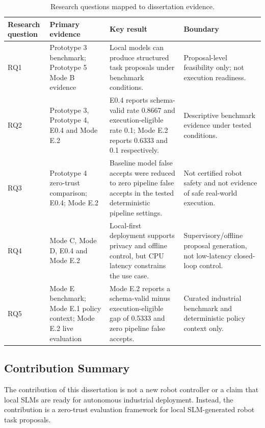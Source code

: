 \documentclass[sigconf,nonacm]{acmart}
\begin{document}
\begin{table}[t]
\centering
\caption{Research questions mapped to dissertation evidence.}
\label{tab:rq_to_evidence}
\footnotesize
\begin{tabularx}{\textwidth}{L{0.12\textwidth}Y Y Y}
\toprule
Research question & Primary evidence & Key result & Boundary \\
\midrule
RQ1 & Prototype 3 benchmark; Prototype 5 Mode B evidence & Local models can produce structured task proposals under benchmark conditions. & Proposal-level feasibility only; not execution readiness. \\
RQ2 & Prototype 3, Prototype 4, E0.4 and Mode E.2 & E0.4 reports schema-valid rate 0.8667 and execution-eligible rate 0.1; Mode E.2 reports 0.6333 and 0.1 respectively. & Descriptive benchmark evidence under tested conditions. \\
RQ3 & Prototype 4 zero-trust comparison; E0.4; Mode E.2 & Baseline model false accepts were reduced to zero pipeline false accepts in the tested deterministic pipeline settings. & Not certified robot safety and not evidence of safe real-world execution. \\
RQ4 & Mode C, Mode D, E0.4 and Mode E.2 & Local-first deployment supports privacy and offline control, but CPU latency constrains the use case. & Supervisory/offline proposal generation, not low-latency closed-loop control. \\
RQ5 & Mode E benchmark; Mode E.1 policy context; Mode E.2 live evaluation & Mode E.2 reports a schema-valid minus execution-eligible gap of 0.5333 and zero pipeline false accepts. & Curated industrial benchmark and deterministic policy context only. \\
\bottomrule
\end{tabularx}
\end{table}

\subsection{Contribution Summary}
\label{sec:introduction_contributions}

The contribution of this dissertation is not a new robot controller or a claim that local SLMs are ready for autonomous industrial deployment. Instead, the contribution is a zero-trust evaluation framework for local SLM-generated robot task proposals.
\end{document}
